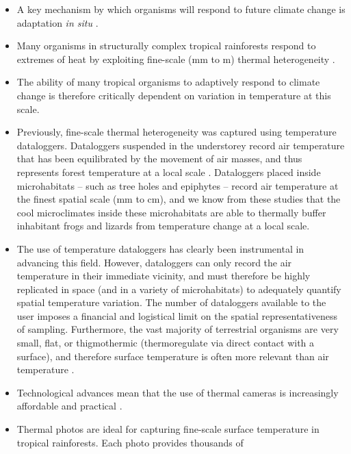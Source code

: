 \documentclass[12pt,a4paper,]{report}
\providecommand{\tightlist}{%
  \setlength{\itemsep}{0pt}\setlength{\parskip}{0pt}}
\theoremstyle{definition}
\theoremstyle{definition}
\theoremstyle{definition}
\theoremstyle{remark}
\begin{document}
\begin{itemize}
\tightlist
\item
  A key mechanism by which organisms will respond to future climate
  change is adaptation \emph{in situ} \citep{hannah_fine-grain_2014}.
\item
  Many organisms in structurally complex tropical rainforests respond to
  extremes of heat by exploiting fine-scale (mm to m) thermal
  heterogeneity
  \citep{scheffers_microhabitats_2014, gonzalez_del_pliego_thermally_2016}.
\item
  The ability of many tropical organisms to adaptively respond to
  climate change is therefore critically dependent on variation in
  temperature at this scale.
\item
  Previously, fine-scale thermal heterogeneity was captured using
  temperature dataloggers. Dataloggers suspended in the understorey
  record air temperature that has been equilibrated by the movement of
  air masses, and thus represents forest temperature at a local scale
  \citep[m to
  ha;][]{scheffers_microhabitats_2014, gonzalez_del_pliego_thermally_2016}.
  Dataloggers placed inside microhabitats -- such as tree holes and
  epiphytes -- record air temperature at the finest spatial scale (mm to
  cm), and we know from these studies that the cool microclimates inside
  these microhabitats are able to thermally buffer inhabitant frogs and
  lizards from temperature change at a local scale.
\item
  The use of temperature dataloggers has clearly been instrumental in
  advancing this field. However, dataloggers can only record the air
  temperature in their immediate vicinity, and must therefore be highly
  replicated in space (and in a variety of microhabitats) to adequately
  quantify spatial temperature variation. The number of dataloggers
  available to the user imposes a financial and logistical limit on the
  spatial representativeness of sampling. Furthermore, the vast majority
  of terrestrial organisms are very small, flat, or thigmothermic
  (thermoregulate via direct contact with a surface), and therefore
  surface temperature is often more relevant than air temperature
  \citep[e.g.][]{kaspari_thermal_2015}.
\item
  Technological advances mean that the use of thermal cameras is
  increasingly affordable and practical
  \citep{scheffers_extreme_2017, faye_toolbox_2016}.
\item
  Thermal photos are ideal for capturing fine-scale surface temperature
  in tropical rainforests. Each photo provides thousands of

\end{itemize}
\end{document}
